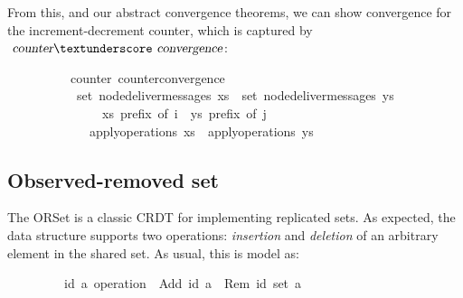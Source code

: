\vspace{0.375em}
From this, and our abstract convergence theorems, we can show convergence for the increment-decrement counter, which is captured by $\isa{counter}{\isacharunderscore}\isa{convergence}$:
\vspace{0.375em}
\begin{isabellebody}
\ \ \ \ \ \ \ \ \ {\isacharparenleft}\ counter{\isacharparenright}\ counter{\isacharunderscore}convergence{\isacharcolon}\isanewline
\ \ \ \ \ \ \ \ \ \ \ {\isachardoublequoteopen}set\ {\isacharparenleft}node{\isacharunderscore}deliver{\isacharunderscore}messages\ xs{\isacharparenright}\ {\isacharequal}\ set\ {\isacharparenleft}node{\isacharunderscore}deliver{\isacharunderscore}messages\ ys{\isacharparenright}{\isachardoublequoteclose}\isanewline
\ \ \ \ \ \ \ \ \ \ \ \ \ \ \ {\isachardoublequoteopen}xs\ prefix\ of\ i{\isachardoublequoteclose}\ \ {\isachardoublequoteopen}ys\ prefix\ of\ j{\isachardoublequoteclose}\isanewline
\ \ \ \ \ \ \ \ \ \ \ \ \ {\isachardoublequoteopen}apply{\isacharunderscore}operations\ xs\ {\isacharequal}\ apply{\isacharunderscore}operations\ ys{\isachardoublequoteclose}
\end{isabellebody}

\subsection{Observed-removed set}
\label{subsect.observed-removed.set}

The ORSet is a classic CRDT for implementing replicated sets.  As expected, the
data structure supports two operations: \emph{insertion} and \emph{deletion} of
an arbitrary element in the shared set. As usual, this is model as:
\vspace{0.375em}
\begin{isabellebody}
\ \ \ \ \ \ \ \ \ {\isacharparenleft}{\isacharprime}id{\isacharcomma}\ {\isacharprime}a{\isacharparenright}\ operation\ {\isacharequal}\ Add\ {\isachardoublequoteopen}{\isacharprime}id{\isachardoublequoteclose}\ {\isachardoublequoteopen}{\isacharprime}a{\isachardoublequoteclose}\ {\isacharbar}\ Rem\ {\isachardoublequoteopen}{\isacharparenleft}{\isacharprime}id\ set{\isacharparenright}{\isachardoublequoteclose}\ {\isachardoublequoteopen}{\isacharprime}a{\isachardoublequoteclose}
\end{isabellebody}
\vspace{0.375em}

